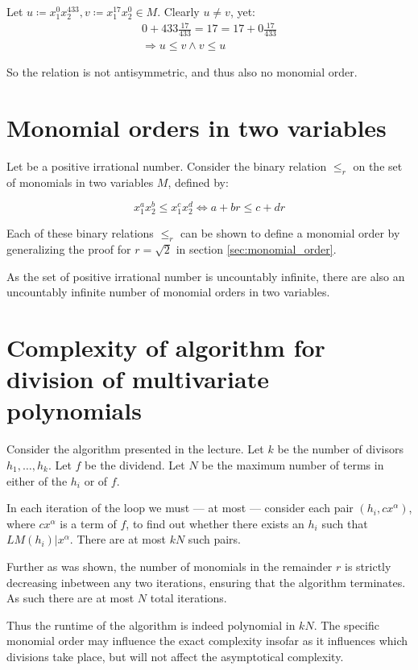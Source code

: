 \documentclass[a4paper]{scrreprt}
\begin{document}
Let $u \coloneqq x_1^0 x_2^{433}, v \coloneqq x_1^{17} x_2^0 \in M$. Clearly $u \neq v$, yet:
\begin{align*}
		0 + 433 \frac{17}{433} = 17 = 17 + 0 \frac{17}{433} \\
		\Rightarrow u \leq v \land v \leq u
\end{align*}

So the relation is not antisymmetric, and thus also no monomial order.


\section{Monomial orders in two variables}

Let be a positive irrational number. Consider the binary relation $\leq_r$ on
the set of monomials in two variables $M$, defined by:

\[
		x_1^a x_2^b \leq x_1^c x_2^d \Leftrightarrow a + br \leq c + dr
\]

Each of these binary relations $\leq_r$ can be shown to define a monomial order
by generalizing the proof for $r = \sqrt{2}$ in section \ref{sec:monomial_order}.

As the set of positive irrational number is uncountably infinite, there are
also an uncountably infinite number of monomial orders in two variables.

\section{Complexity of algorithm for division of multivariate polynomials}

Consider the algorithm presented in the lecture. Let $k$ be the number of
divisors $h_1, \ldots, h_k$. Let $f$ be the dividend. Let $N$ be the maximum
number of terms in either of the $h_i$ or of $f$.

In each iteration of the loop we must --- at most --- consider each pair $(h_i,
c x^\alpha)$, where $c x^\alpha$ is a term of $f$, to find out whether there
exists an $h_i$ such that $LM(h_i) | x^\alpha$. There are at most $kN$ such pairs.

Further as was shown, the number of monomials in the remainder $r$ is strictly
decreasing inbetween any two iterations, ensuring that the algorithm
terminates. As such there are at most $N$ total iterations.

Thus the runtime of the algorithm is indeed polynomial in $kN$. The specific
monomial order may influence the exact complexity insofar as it influences
which divisions take place, but will not affect the asymptotical complexity.


\printbibliography{}
\end{document}
